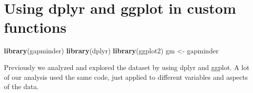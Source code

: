 \documentclass[
]{book}
\newenvironment{Shaded}{\begin{snugshade}}{\end{snugshade}}
\newcommand{\CommentTok}[1]{\textcolor[rgb]{0.56,0.35,0.01}{\textit{#1}}}
\newcommand{\DataTypeTok}[1]{\textcolor[rgb]{0.13,0.29,0.53}{#1}}
\newcommand{\KeywordTok}[1]{\textcolor[rgb]{0.13,0.29,0.53}{\textbf{#1}}}
\newcommand{\NormalTok}[1]{#1}
\newcommand{\OperatorTok}[1]{\textcolor[rgb]{0.81,0.36,0.00}{\textbf{#1}}}
\newcommand{\StringTok}[1]{\textcolor[rgb]{0.31,0.60,0.02}{#1}}
\begin{document}
\hypertarget{using-dplyr-and-ggplot-in-custom-functions}{%
\section{Using dplyr and ggplot in custom functions}\label{using-dplyr-and-ggplot-in-custom-functions}}

\begin{Shaded}
\begin{Highlighting}[]
\KeywordTok{library}\NormalTok{(gapminder)}
\KeywordTok{library}\NormalTok{(dplyr)}
\KeywordTok{library}\NormalTok{(ggplot2)}
\NormalTok{gm <-}\StringTok{ }\NormalTok{gapminder}
\end{Highlighting}
\end{Shaded}

Previously we analyzed and explored the dataset by using dplyr and ggplot. A lot of our analysis used the same code, just applied to different variables and aspects of the data.

\begin{Shaded}
\end{Shaded}
\end{document}

